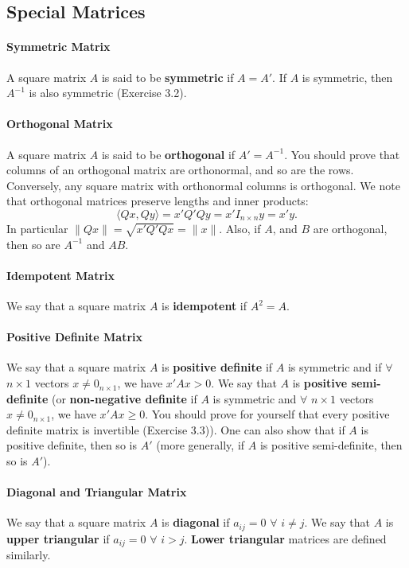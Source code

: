 \documentclass[12pt,oneside]{article}
\begin{document}
\subsection{Special Matrices}

\paragraph{Symmetric Matrix}
A square matrix $A$ is said to be \textbf{symmetric} if $A = A'$. If $A$ is symmetric, then $A^{-1}$ is also symmetric (Exercise 3.2). 

\paragraph{Orthogonal Matrix}
A square matrix $A$ is said to be \textbf{orthogonal} if $A' = A^{-1}$. You should prove that columns of an orthogonal matrix are orthonormal, and so are the rows. Conversely, any square matrix with orthonormal columns is orthogonal. We note that orthogonal matrices preserve lengths and inner products: 
$$\langle Qx, Qy \rangle = x'Q'Qy = x'I_{n \times n}y = x'y.$$ 
In particular $\|Qx\|= \sqrt{x'Q'Qx} = \|x\|$. Also, if $A$, and $B$ are orthogonal, then so are $A^{-1}$ and $AB$. 

\paragraph{Idempotent Matrix}
We say that a square matrix $A$ is \textbf{idempotent} if $A^2 = A$.

\paragraph{Positive Definite Matrix}
We say that a square matrix $A$ is \textbf{positive definite} if $A$ is symmetric and if $\forall$ $n \times 1$ vectors $x \neq 0_{n \times 1}$, we have $x'Ax > 0$. We say that $A$ is \textbf{positive  semi-definite} (or \textbf{non-negative definite} if $A$ is symmetric and $\forall$ $n \times 1$ vectors $x \neq 0_{n \times 1}$, we have $x'Ax \geq 0$. You should prove for yourself that every positive definite matrix is invertible (Exercise 3.3)). One can also show that if $A$ is positive definite, then so is $A'$ (more generally, if $A$ is positive semi-definite, then so is $A'$).

\paragraph{Diagonal and Triangular Matrix}
We say that a square matrix $A$ is \textbf{diagonal} if $a_{ij} = 0$ $\forall$ $i \neq j$. We say that $A$ is \textbf{upper triangular} if $a_{ij} = 0$ $\forall$ $i > j$. \textbf{Lower triangular} matrices are defined similarly.
\end{document}
